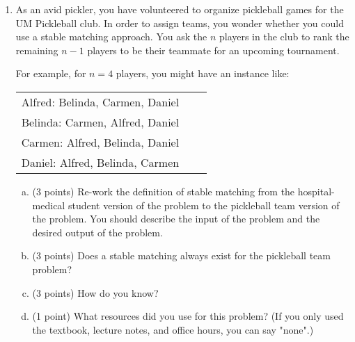 \documentclass[11pt]{article}
\begin{document}
\newpage



\begin{enumerate}


\item 

As an avid pickler, you have volunteered to organize pickleball games for the UM Pickleball club.
In order to assign teams, you wonder whether you could use a stable matching approach.
You ask the $n$ players in the club to rank the remaining $n-1$ players to be their teammate for
an upcoming tournament. 

For example, for $n=4$ players, you might have an instance like: 

\begin{center}
\begin{tabular}{ c c c }
    Alfred: Belinda, Carmen, Daniel \\
    Belinda: Carmen, Alfred, Daniel \\
    Carmen: Alfred, Belinda, Daniel\\
    Daniel: Alfred, Belinda, Carmen
\end{tabular}
\end{center}

\begin{enumerate}[(a)]
    \item (3 points) Re-work the definition of stable matching from the hospital-medical student
        version of the problem to the pickleball team version of the problem.
        You should describe the input of the problem and the desired output of the problem.
    \item (3 points) Does a stable matching always exist for the pickleball team problem?
    \item (3 points) How do you know?
    \item (1 point) What resources did you use for this problem? (If you only used the textbook, lecture notes, and office hours, you can say "none".)
\end{enumerate}

\end{enumerate}
\end{document}
